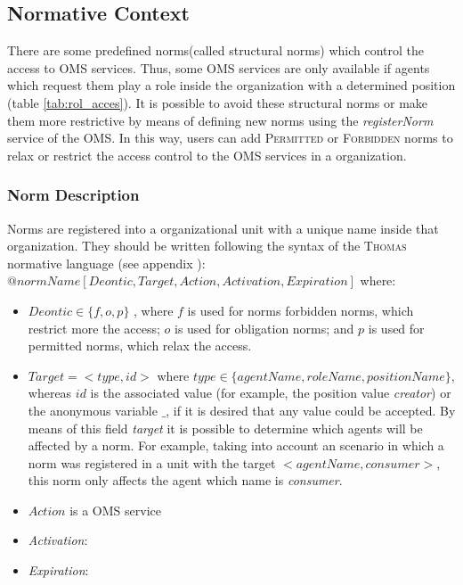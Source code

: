 \subsection{Normative Context}



There are some predefined norms(called structural norms) which control the access to OMS services. Thus, some OMS services are only available if  agents which request them play a role inside the organization with a determined position (table \ref{tab:rol_acces}). It is possible to avoid these structural norms or make them more restrictive by means of defining new norms using the \textit{registerNorm} service of the OMS. In this way, users can add \textsc{Permitted} or \textsc{Forbidden}  norms to relax or restrict  the access control to the OMS services in a organization. 



\subsubsection{Norm Description}
Norms are registered into a organizational unit with a unique name inside that organization. They should be written following the syntax of the \textsc{Thomas} normative language (see appendix ): \\
$@normName[Deontic, Target, Action, Activation, Expiration]$ where:
\begin{itemize}
 \item $Deontic \in \lbrace f,o,p \rbrace$ , where $f$ is used for norms forbidden norms, which restrict more the access; $o$ is used for obligation norms; and $p$ is used for permitted norms, which relax the access.
 \item $Target=<type,id>$ where $type \in   \lbrace agentName, roleName, positionName \rbrace $, whereas $id$ is the associated value (for example, the position value \textit{creator}) or the anonymous variable $\_$, if it is desired that any value could be accepted.  By means of this field \textit{target} it is possible to determine which agents will be affected by a norm. For example, taking into account an scenario in which a norm was registered in a unit with the target $<agentName, consumer>$, this norm only affects the agent which name is \textit{consumer}. 
 
 \item $Action$ is a OMS service
 \item \textit{Activation}:
 \item \textit{Expiration}:
 
\end{itemize}

